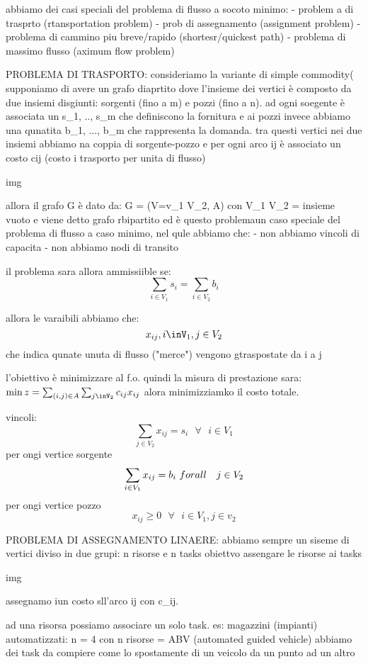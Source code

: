 abbiamo dei casi speciali del problema di flusso a socoto minimo:
- problem a di trasprto (rtansportation problem)
- prob di assegnamento (assignment problem)
- problema di cammino piu breve/rapido (shortesr/quickest path)
- problema di massimo flusso (aximum flow problem)




PROBLEMA DI TRASPORTO:
consideriamo la variante di simple commodity( supponiamo di avere un grafo diaprtito dove l'insieme dei vertici è composto da due insiemi disgiunti: sorgenti (fino a m) e pozzi (fino a n). ad ogni soegente è associata un s_1, .., s_m  che definiscono la fornitura e ai pozzi invece abbiamo una qunatita b_1, ..., b_m che rappresenta la domanda. tra questi vertici nei due insiemi abbiamo na coppia di sorgente-pozzo e per ogni arco ij è associato un costo cij (costo i trasporto per unita di flusso)

img

allora il grafo G è dato da: G = (V=v_1 \cup V_2, A) con V_1 \cap V_2 = insieme vuoto e viene detto grafo rbipartito ed è questo problemaun caso speciale del problema di flusso a caso minimo, nel qule abbiamo che:
- non abbiamo vincoli di capacita
- non abbiamo nodi di transito

il problema sara allora ammissiible se:
$$\sum_{i\in V_1} s_i = \sum_{i\in V_2} b_i$$

allora le varaibili abbiamo che:
$$x_{ij}, i\inV_1, j\in V_2$$ che indica qunate unuta di flusso ("merce") vengono gtraspostate da i a j


l'obiettivo è minimizzare al f.o. quindi la misura di prestazione sara: $\min z = \sum_{(i,j)\in A}\sum_{j\inV_2} c_{ij}x_{ij}$ alora minimizziamko il costo totale.

vincoli:
$$\sum_{j\in V_2} x_{ij} = s_i\ \ \ \forall\ \ \ i\in V_1$$ per ongi vertice sorgente
$$\sum_{i\in V_1} x_{ij} = b_i\ \  \\forall\ \ \ j\in V_2$$ per ongi vertice pozzo
$$x_{ij} \geq 0\ \ \ \forall\ \ \ i\in V_1, j\in v_2$$



PROBLEMA DI ASSEGNAMENTO LINAERE:
abbiamo sempre un siseme di vertici diviso in due grupi: n risorse e n tasks
obiettvo assengare le risorse ai tasks

img

assegnamo iun costo sll'arco ij con c_{ij}.

ad una risorsa possiamo associare un solo task.
es: magazzini (impianti) automatizzati: n = 4 con n risorse = ABV (automated guided vehicle)
abbiamo dei task da compiere come lo spostamente di un veicolo da un punto ad un altro

